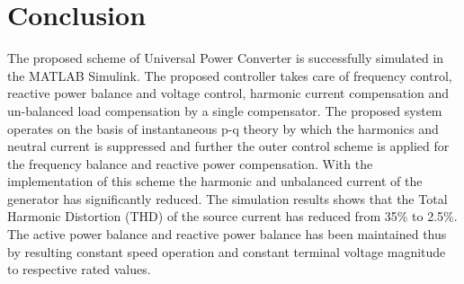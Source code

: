 \documentclass[journal,twoside]{IEEEtran}
\begin{document}
\section{Conclusion}

The proposed scheme of Universal Power Converter is
successfully simulated in the MATLAB Simulink. The
proposed controller takes care of frequency control, reactive
power balance and voltage control, harmonic current
compensation and un-balanced load compensation by a
single compensator. The proposed system operates on the
basis of instantaneous p-q theory by which the harmonics
and neutral current is suppressed and further the outer
control scheme is applied for the frequency balance and
reactive power compensation. With the implementation of
this scheme the harmonic and unbalanced current of the
generator has significantly reduced. The simulation results
shows that the Total Harmonic Distortion (THD) of the
source current has reduced from 35\% to 2.5\%. The active
power balance and reactive power balance has been
maintained thus by resulting constant speed operation and
constant terminal voltage magnitude to respective rated
values.
\end{document}
